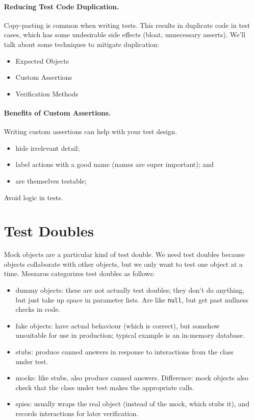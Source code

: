 \documentclass[11pt]{article}
\begin{document}
\paragraph{Reducing Test Code Duplication.}
Copy-pasting is common when writing tests. This results in
duplicate code in test cases, which has some undesirable
side effects (bloat, unnecessary asserts). We'll talk about
some techniques to mitigate duplication:
\begin{itemize}[noitemsep]
\item Expected Objects
\item Custom Assertions
\item Verification Methods
\end{itemize}

\paragraph{Benefits of Custom Assertions.}
Writing custom assertions can help with your test design.
\begin{itemize}[noitemsep]
  \item hide irrelevant detail;
  \item label actions with a good name (names are super important); and
  \item are themselves testable;
\end{itemize}

Avoid logic in tests.

\section*{Test Doubles}
Mock objects are a particular kind of test double. We need test doubles
because objects collaborate with other objects, but we only want to test
one object at a time.
Meszaros categorizes test doubles as follows:
\begin{itemize}[noitemsep]
    \item dummy objects: these are not actually test doubles; they don't do anything, but just take up space in parameter lists. Are like {\tt null}, but get past nullness checks in code.
    \item fake objects: have actual behaviour (which is correct), but somehow unsuitable for use in production; typical example is an in-memory database.
    \item stubs: produce canned answers in response to interactions from the class under test.
    \item mocks: like stubs, also produce canned answers. Difference: mock objects also check that the class under test makes the appropriate calls.
    \item spies: usually wraps the real object (instead of the mock, which stubs it), and records interactions for later verification.
\end{itemize}
\end{document}
